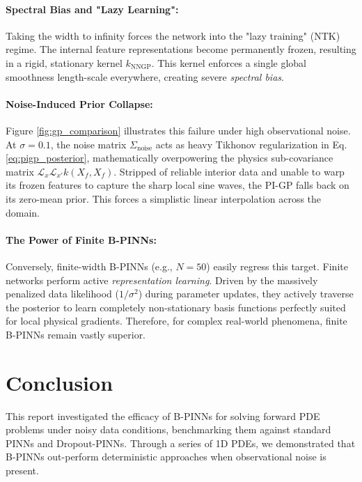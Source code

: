 \documentclass{article}
\begin{document}
\paragraph{Spectral Bias and "Lazy Learning":}
Taking the width to infinity forces the network into the "lazy training" (NTK) regime. The internal feature representations become permanently frozen, resulting in a rigid, stationary kernel $k_{\text{NNGP}}$. This kernel enforces a single global smoothness length-scale everywhere, creating severe \emph{spectral bias}.

\paragraph{Noise-Induced Prior Collapse:}
Figure \ref{fig:gp_comparison} illustrates this failure under high observational noise. At $\sigma=0.1$, the noise matrix $\Sigma_{\text{noise}}$ acts as heavy Tikhonov regularization in Eq. \ref{eq:pigp_posterior}, mathematically overpowering the physics sub-covariance matrix $\mathcal{L}_x \mathcal{L}_{x'} k(X_f, X_f)$. Stripped of reliable interior data and unable to warp its frozen features to capture the sharp local sine waves, the PI-GP falls back on its zero-mean prior. This forces a simplistic linear interpolation across the domain.

\paragraph{The Power of Finite B-PINNs:}
Conversely, finite-width B-PINNs (e.g., $N=50$) easily regress this target. Finite networks perform active \emph{representation learning}. Driven by the massively penalized data likelihood ($1/\sigma^2$) during parameter updates, they actively traverse the posterior to learn completely non-stationary basis functions perfectly suited for local physical gradients. Therefore, for complex real-world phenomena, finite B-PINNs remain vastly superior.



\section{Conclusion}
This report investigated the efficacy of B-PINNs for solving forward PDE problems under noisy data conditions, benchmarking them against standard PINNs and Dropout-PINNs. Through a series of 1D PDEs, we demonstrated that B-PINNs out-perform deterministic approaches when observational noise is present. 
\end{document}
